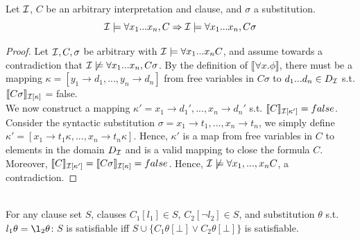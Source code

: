 \begin{lemma}\label{lem:2}
Let $\mathcal{I}$, $C$ be an arbitrary interpretation and clause, and $\sigma$ a substitution.
\[\mathcal{I} \models \forall x_1...x_n, C \Rightarrow \mathcal{I} \models \forall x_1...x_n, C\sigma\]
\end{lemma}
\begin{proof}
  Let $\mathcal{I}, C, \sigma$ be arbitrary with $\mathcal{I} \models \forall x_1...x_n C$, and assume towards a contradiction that $\mathcal{I} \not\models \forall x_1...x_n, C\sigma$. By the definition of $\llbracket \forall x. \phi\rrbracket$, there must be a mapping $\kappa = [y_1 \to d_1,...,y_n\to d_n]$ from free variables in $C\sigma$ to $d_1...d_n \in D_{\mathcal{I}}$ s.t. $\llbracket C\sigma\rrbracket_{\mathcal{I}[\kappa]}$ = false.\\
  We now construct a mapping $\kappa' = x_1 \to d_1', ..., x_n \to d_n'$ s.t. $\llbracket C \rrbracket_{\mathcal{I}[\kappa']}= false$.
  Consider the syntactic substitution $\sigma = x_1 \to t_1,...,x_n \to t_n$, we simply define $\kappa' = [x_1 \to t_1\kappa, ..., x_n \to t_n\kappa]$. Hence, $\kappa'$ is a map from free variables in $C$ to elements in the domain $D_{\mathcal{I}}$ and is a valid mapping to close the formula $C$. Moreover, $\llbracket C\rrbracket_{\mathcal{I}[\kappa']} = \llbracket C\sigma\rrbracket_{\mathcal{I}[\kappa]} = false$.
  Hence, $\mathcal{I} \not \models \forall x_1,...,x_n C$, a contradiction.
\end{proof}

\begin{theorem}$ $\\
  For any clause set $S$, clauses $C_1[l_1] \in S$, $C_2[\neg l_2] \in S$, and substitution $\theta$ s.t. $l_1\theta = \l_2\theta$:
  $S$ is satisfiable iff $S \cup \{C_1\theta[\bot] \lor C_2\theta[\bot]\}$ is satisfiable.
\end{theorem}

